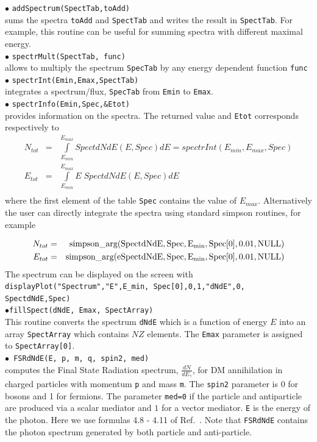 \documentclass[12pt,a4paper]{article}
\begin{document}
\noindent
$\bullet$ \verb|addSpectrum(SpectTab,toAdd)|\\
sums the  spectra \verb|toAdd|  and \verb|SpectTab| and writes the result in \verb|SpectTab|. For example, this routine can be useful for summing spectra 
with different  maximal energy.\\
\noindent
$\bullet$ \verb|spectrMult(SpectTab, func)|\\
allows to multiply the spectrum \verb|SpecTab| by any energy dependent function \verb|func|\\
\noindent
$\bullet$ \verb|spectrInt(Emin,Emax,SpectTab) | \\
integrates a spectrum/flux, \verb|SpecTab| from {\tt Emin} to  {\tt Emax}.\\
\noindent
$\bullet$ \verb|spectrInfo(Emin,Spec,&Etot)|\\
provides information on the spectra. The  returned value and \verb|Etot| corresponds respectively to   
\begin{eqnarray}
  N_{tot}&=&\int \limits_{E_{min}}^{E_{max}} SpectdNdE(E,Spec) dE = spectrInt(E_{min},E_{max},Spec) \\ 
  E_{tot}&=&  \int \limits_{E_{min}}^{E_{max}} E\; SpectdNdE(E,Spec)dE\\
  \nonumber
 \end{eqnarray}
where the first element of the table {\tt Spec} contains the value of   $E_{max}$.
Alternatively the user can directly integrate the spectra using standard simpson routines, for example

\begin{eqnarray}
  N_{tot}&=& {\rm simpson\_arg(SpectdNdE,Spec,E_{min},Spec[0],0.01,NULL)} \\ 
  E_{tot}&=&{\rm simpson\_arg(eSpectdNdE,Spec,E_{min},Spec[0],0.01,NULL)}
  \nonumber
 \end{eqnarray}
The spectrum can be displayed on the screen with \\
{\tt displayPlot("Spectrum","E",E\_min, Spec[0],0,1,"dNdE",0, SpectdNdE,Spec)}
\\


\noindent
$\bullet$\verb|fillSpect(dNdE, Emax, SpectArray)|\\
This routine converts the spectrum \verb|dNdE| which is  a function of energy $E$ into an array {\tt SpectArray} which contains $NZ$ elements.
The {\tt Emax} parameter is assigned to {\tt SpectArray[0]}.\\

\noindent
$\bullet$\verb| FSRdNdE(E, p, m, q, spin2, med)|\\
computes the  Final State Radiation spectrum, $ \frac{dN}{dE_{\gamma}}$,  for DM  annihilation in charged particles with  momentum {\tt p} and mass {\tt m}.
The {\tt spin2} parameter is 0 for bosons and 1 for fermions. The parameter {\tt med=0} if the particle and antiparticle are produced via a
scalar mediator and $1$ for a  vector mediator. {\tt E} is the energy of the  photon.    Here we use formulas 4.8 - 4.11  
of Ref.~\cite{Coogan_2020}. Note that {\tt FSRdNdE} contains the photon spectrum  generated by  both particle and anti-particle.   
\end{document}

